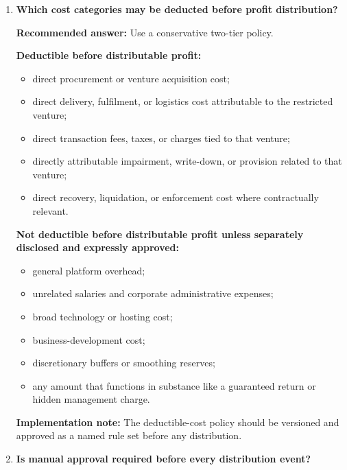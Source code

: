 \documentclass[11pt]{article}
\begin{document}
\begin{enumerate}[leftmargin=1.8em,label=\textbf{Q\arabic*.}]
    Realized profit should be distributed only after the agreed calculation basis and deductible-cost policy have been approved.

    \item \textbf{Which cost categories may be deducted before profit distribution?}

    \textbf{Recommended answer:} Use a conservative two-tier policy.

    \textbf{Deductible before distributable profit:}
    \begin{itemize}[leftmargin=1.5em]
        \item direct procurement or venture acquisition cost;
        \item direct delivery, fulfilment, or logistics cost attributable to the restricted venture;
        \item direct transaction fees, taxes, or charges tied to that venture;
        \item directly attributable impairment, write-down, or provision related to that venture;
        \item direct recovery, liquidation, or enforcement cost where contractually relevant.
    \end{itemize}

    \textbf{Not deductible before distributable profit unless separately disclosed and expressly approved:}
    \begin{itemize}[leftmargin=1.5em]
        \item general platform overhead;
        \item unrelated salaries and corporate administrative expenses;
        \item broad technology or hosting cost;
        \item business-development cost;
        \item discretionary buffers or smoothing reserves;
        \item any amount that functions in substance like a guaranteed return or hidden management charge.
    \end{itemize}

    \textbf{Implementation note:} The deductible-cost policy should be versioned and approved as a named rule set before any distribution.

    \item \textbf{Is manual approval required before every distribution event?}


\end{enumerate}
\end{document}
